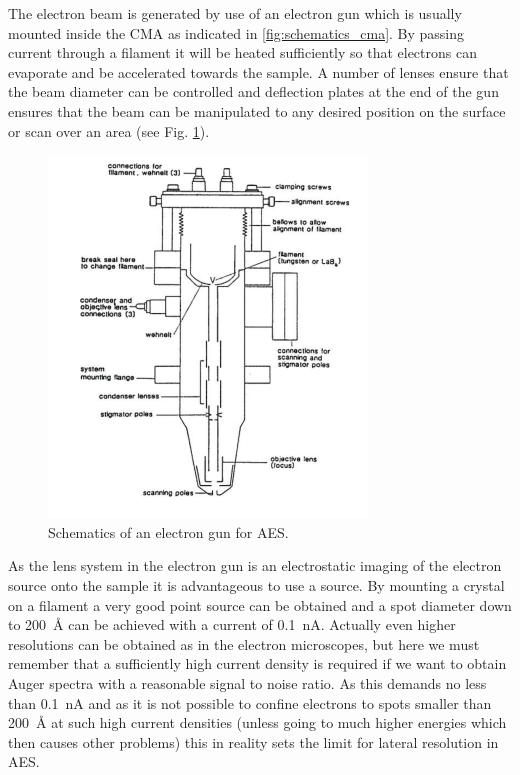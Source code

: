 The electron beam is generated by use of an electron gun which is usually mounted inside the CMA as indicated in \autoref{fig:schematics_cma}. By passing current through a filament it will be heated sufficiently so that electrons can evaporate and be accelerated towards the sample. A number  of lenses ensure that the beam diameter can be controlled and deflection plates at the end of the gun ensures that the beam can be manipulated to any desired position on the surface or scan over an area (see Fig. \ref{fig:aesschem}).

\begin{figure}[h!]
	\begin{center}
	\includegraphics[scale=4]{figures/06_02.png}
	\caption{Schematics of an electron gun for AES.}
	\label{fig:aesschem}
	\end{center}
\end{figure}

As the lens system in the electron gun is an electrostatic imaging of the electron source onto the sample it is advantageous to use a  source. By mounting a  crystal on a filament a very good point source can be obtained and a spot diameter down to \SI{200}{\angstrom} can be achieved with a current of \SI{0.1}{nA}. Actually even higher resolutions can be obtained as in the  electron microscopes, but here we must remember that a sufficiently high current density is required if we want to obtain Auger spectra with a reasonable signal to noise ratio. As this demands no less than \SI{0.1}{nA} and as it is not possible to  confine electrons to spots smaller than \SI{200}{\angstrom} at such high  current  densities (unless going to much higher energies which then causes other problems) this in reality sets the limit for lateral resolution in AES.

